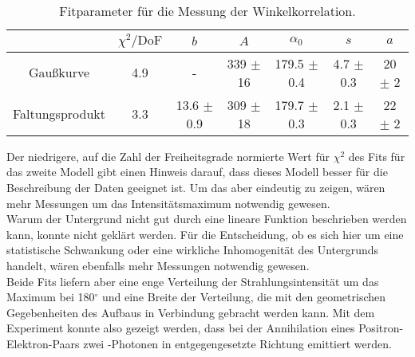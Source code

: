 \begin{table}[H]
\caption{Fitparameter für die Messung der Winkelkorrelation.}
\begin{center}
\begin{tabular}{|c|c|c|c|c|c|c|}
  \hline
   & $\chi^2 / \text{DoF}$ & $b$ & $A$ & $\alpha_0$ & $s$ & $a$ \\ \hline  
 Gaußkurve  & 4.9 & - & 339 $\pm$ 16 & 179.5 $\pm$ 0.4 & 4.7 $\pm$ 0.3 & 20 $\pm$ 2 \\ \hline  
 Faltungsprodukt & 3.3 & 13.6 $\pm$ 0.9 & 309 $\pm$ 18  & 179.7 $\pm$ 0.3 & 2.1 $\pm$ 0.3 & 22 $\pm$ 2 \\ \hline 
 
\end{tabular}
\end{center}
\label{tab:angfit}
\end{table}

Der niedrigere, auf die Zahl der Freiheitsgrade normierte Wert für $\chi^2$ des Fits für das zweite Modell
gibt einen Hinweis darauf, dass dieses Modell besser für die Beschreibung der Daten geeignet ist.
Um das aber eindeutig zu zeigen, wären mehr Messungen um das Intensitätsmaximum notwendig gewesen.\\
Warum der Untergrund nicht gut durch eine lineare Funktion beschrieben werden kann,
konnte nicht geklärt werden.
Für die Entscheidung, ob es sich hier um eine statistische Schwankung oder eine wirkliche
Inhomogenität des Untergrunds handelt, wären ebenfalls mehr Messungen notwendig gewesen.\\
Beide Fits liefern aber eine enge Verteilung der Strahlungsintensität um das Maximum bei 180$^\circ$
und eine Breite der Verteilung, die mit den geometrischen Gegebenheiten des Aufbaus in Verbindung gebracht
werden kann.
Mit dem Experiment konnte also gezeigt werden, dass bei der Annihilation eines Positron-Elektron-Paars
zwei \textgamma-Photonen in entgegengesetzte Richtung emittiert werden.


